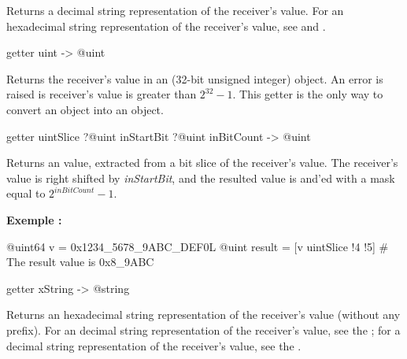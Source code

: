 Returns a decimal string representation of the receiver's value. For an hexadecimal string representation of the receiver's value, see  and .




\begin{galgas3}
getter uint -> @uint
\end{galgas3}

Returns the receiver's value in an  (32-bit unsigned integer) object. An error is raised is receiver's value is greater than $2^{32}-1$. This getter is the only way to convert an  object into an  object.



\begin{galgas3}
getter uintSlice ?@uint inStartBit ?@uint inBitCount -> @uint
\end{galgas3}



Returns an  value, extracted from a bit slice of the receiver's value. The receiver's value is right shifted by \emph{inStartBit}, and the resulted value is and'ed with a mask equal to $2^{inBitCount}-1$.


\textbf{Exemple :}
\begin{galgas3}
@uint64 v = 0x1234_5678_9ABC_DEF0L
@uint result = [v uintSlice !4 !5] # The result value is 0x8_9ABC
\end{galgas3}






\begin{galgas3}
getter xString -> @string
\end{galgas3}

Returns an hexadecimal string representation of the receiver's value (without any prefix). For an decimal string representation of the receiver's value, see the ; for a decimal string representation of the receiver's value, see the .










